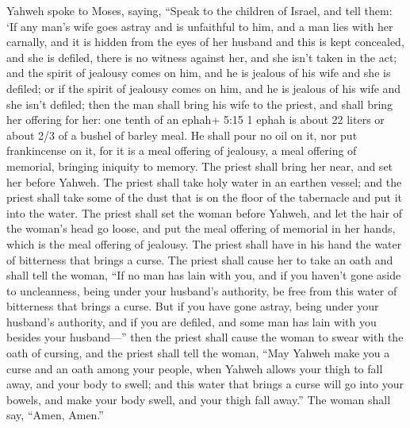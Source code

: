  Yahweh spoke to Moses, saying,  ``Speak to
the children of Israel, and tell them: `If any man's wife goes astray
and is unfaithful to him,  and a man lies with her
carnally, and it is hidden from the eyes of her husband and this is kept
concealed, and she is defiled, there is no witness against her, and she
isn't taken in the act;  and the spirit of jealousy comes
on him, and he is jealous of his wife and she is defiled; or if the
spirit of jealousy comes on him, and he is jealous of his wife and she
isn't defiled;  then the man shall bring his wife to the
priest, and shall bring her offering for her: one tenth of an ephah+
5:15 1 ephah is about 22 liters or about 2/3 of a bushel of barley meal.
He shall pour no oil on it, nor put frankincense on it, for it is a meal
offering of jealousy, a meal offering of memorial, bringing iniquity to
memory.  The priest shall bring her near, and set her
before Yahweh.  The priest shall take holy water in an
earthen vessel; and the priest shall take some of the dust that is on
the floor of the tabernacle and put it into the water.  The
priest shall set the woman before Yahweh, and let the hair of the
woman's head go loose, and put the meal offering of memorial in her
hands, which is the meal offering of jealousy. The priest shall have in
his hand the water of bitterness that brings a curse.  The
priest shall cause her to take an oath and shall tell the woman, ``If no
man has lain with you, and if you haven't gone aside to uncleanness,
being under your husband's authority, be free from this water of
bitterness that brings a curse.  But if you have gone
astray, being under your husband's authority, and if you are defiled,
and some man has lain with you besides your husband---'' 
then the priest shall cause the woman to swear with the oath of cursing,
and the priest shall tell the woman, ``May Yahweh make you a curse and
an oath among your people, when Yahweh allows your thigh to fall away,
and your body to swell;  and this water that brings a curse
will go into your bowels, and make your body swell, and your thigh fall
away.'' The woman shall say, ``Amen, Amen.''

